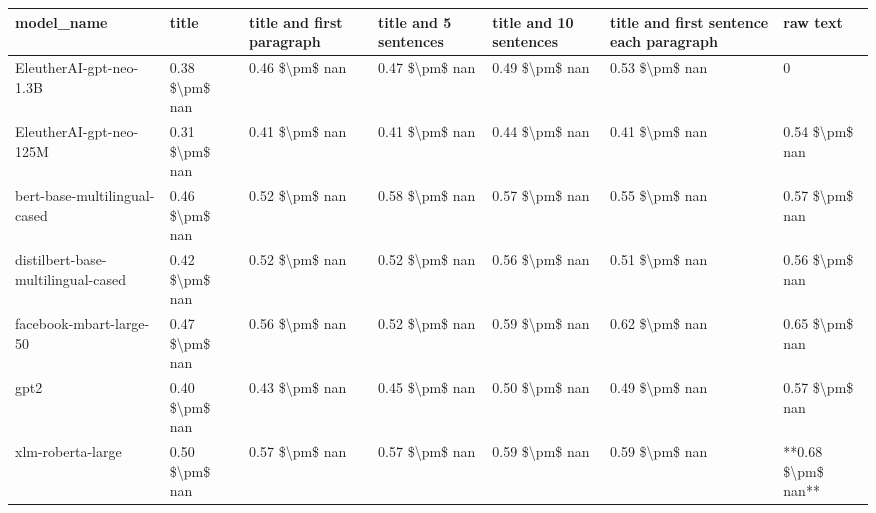 \begin{tabular}{lllllll}
\toprule
                        model\_name &          title & title and first paragraph & title and 5 sentences & title and 10 sentences & title and first sentence each paragraph &           raw text \\
\midrule
           EleutherAI-gpt-neo-1.3B & 0.38 \$\textbackslash pm\$ nan &            0.46 \$\textbackslash pm\$ nan &        0.47 \$\textbackslash pm\$ nan &         0.49 \$\textbackslash pm\$ nan &                          0.53 \$\textbackslash pm\$ nan &                  0 \\
           EleutherAI-gpt-neo-125M & 0.31 \$\textbackslash pm\$ nan &            0.41 \$\textbackslash pm\$ nan &        0.41 \$\textbackslash pm\$ nan &         0.44 \$\textbackslash pm\$ nan &                          0.41 \$\textbackslash pm\$ nan &     0.54 \$\textbackslash pm\$ nan \\
      bert-base-multilingual-cased & 0.46 \$\textbackslash pm\$ nan &            0.52 \$\textbackslash pm\$ nan &        0.58 \$\textbackslash pm\$ nan &         0.57 \$\textbackslash pm\$ nan &                          0.55 \$\textbackslash pm\$ nan &     0.57 \$\textbackslash pm\$ nan \\
distilbert-base-multilingual-cased & 0.42 \$\textbackslash pm\$ nan &            0.52 \$\textbackslash pm\$ nan &        0.52 \$\textbackslash pm\$ nan &         0.56 \$\textbackslash pm\$ nan &                          0.51 \$\textbackslash pm\$ nan &     0.56 \$\textbackslash pm\$ nan \\
           facebook-mbart-large-50 & 0.47 \$\textbackslash pm\$ nan &            0.56 \$\textbackslash pm\$ nan &        0.52 \$\textbackslash pm\$ nan &         0.59 \$\textbackslash pm\$ nan &                          0.62 \$\textbackslash pm\$ nan &     0.65 \$\textbackslash pm\$ nan \\
                              gpt2 & 0.40 \$\textbackslash pm\$ nan &            0.43 \$\textbackslash pm\$ nan &        0.45 \$\textbackslash pm\$ nan &         0.50 \$\textbackslash pm\$ nan &                          0.49 \$\textbackslash pm\$ nan &     0.57 \$\textbackslash pm\$ nan \\
                 xlm-roberta-large & 0.50 \$\textbackslash pm\$ nan &            0.57 \$\textbackslash pm\$ nan &        0.57 \$\textbackslash pm\$ nan &         0.59 \$\textbackslash pm\$ nan &                          0.59 \$\textbackslash pm\$ nan & **0.68 \$\textbackslash pm\$ nan** \\
\bottomrule
\end{tabular}
